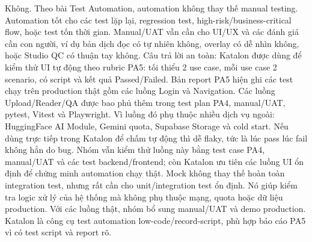 \markdownRendererInterblockSeparator
{}Không. Theo bài Test Automation, automation không thay thế manual testing. Automation tốt cho các test lặp lại, regression test, high-risk/business-critical flow, hoặc test tốn thời gian.\markdownRendererParagraphSeparator
{}Manual/UAT vẫn cần cho UI/UX và các đánh giá cần con người, ví dụ bản dịch đọc có tự nhiên không, overlay có dễ nhìn không, hoặc Studio QC có thuận tay không.\markdownRendererInterblockSeparator
{}
\markdownRendererSectionEnd \markdownRendererSectionBegin
{}\markdownRendererInterblockSeparator
{}Câu trả lời an toàn:\markdownRendererParagraphSeparator
{}Katalon được dùng để kiểm thử UI tự động theo rubric PA5: tối thiểu 2 use case, mỗi use case 2 scenario, có script và kết quả Passed/Failed.\markdownRendererParagraphSeparator
{}Bản report PA5 hiện ghi các test chạy trên production thật gồm các luồng Login và Navigation. Các luồng Upload/Reader/Q\markdownRendererAmpersand{}A được bao phủ thêm trong test plan PA4, manual/UAT, pytest, Vitest và Playwright.\markdownRendererInterblockSeparator
{}
\markdownRendererSectionEnd \markdownRendererSectionBegin
{}\markdownRendererInterblockSeparator
{}Vì luồng đó phụ thuộc nhiều dịch vụ ngoài: HuggingFace AI Module, Gemini quota, Supabase Storage và cold start. Nếu dùng trực tiếp trong Katalon để chấm tự động thì dễ flaky, tức là lúc pass lúc fail không hẳn do bug.\markdownRendererParagraphSeparator
{}Nhóm vẫn kiểm thử luồng này bằng test case PA4, manual/UAT và các test backend/frontend; còn Katalon ưu tiên các luồng UI ổn định để chứng minh automation chạy thật.\markdownRendererInterblockSeparator
{}
\markdownRendererSectionEnd \markdownRendererSectionBegin
{}\markdownRendererInterblockSeparator
{}Mock không thay thế hoàn toàn integration test, nhưng rất cần cho unit/integration test ổn định.\markdownRendererParagraphSeparator
{}Nó giúp kiểm tra logic xử lý của hệ thống mà không phụ thuộc mạng, quota hoặc dữ liệu production. Với các luồng thật, nhóm bổ sung manual/UAT và demo production.\markdownRendererInterblockSeparator
{}
\markdownRendererSectionEnd \markdownRendererSectionBegin
{}\markdownRendererInterblockSeparator
{}Katalon là công cụ test automation low-code/record-script, phù hợp báo cáo PA5 vì có test script và report rõ.\markdownRendererParagraphSeparator
